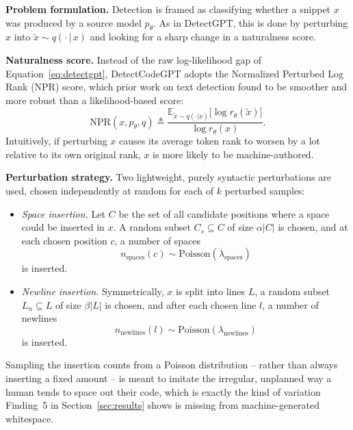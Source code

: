 \documentclass[manuscript,review]{acmart}
\begin{document}
\textbf{Problem formulation.} Detection is framed as classifying whether a snippet $x$ was produced by a source model $p_\theta$. As in DetectGPT, this is done by perturbing $x$ into $\tilde{x} \sim q(\cdot\,|\,x)$ and looking for a sharp change in a naturalness score.

\textbf{Naturalness score.} Instead of the raw log-likelihood gap of Equation~\ref{eq:detectgpt}, DetectCodeGPT adopts the Normalized Perturbed Log Rank (NPR) score, which prior work on text detection found to be smoother and more robust than a likelihood-based score:
\begin{equation}
\mathrm{NPR}(x, p_\theta, q) \triangleq \frac{\mathbb{E}_{\tilde{x}\sim q(\cdot|x)}\big[\log r_\theta(\tilde{x})\big]}{\log r_\theta(x)}.
\label{eq:npr}
\end{equation}
Intuitively, if perturbing $x$ causes its average token rank to worsen by a lot relative to its own original rank, $x$ is more likely to be machine-authored.

\textbf{Perturbation strategy.} Two lightweight, purely syntactic perturbations are used, chosen independently at random for each of $k$ perturbed samples:
\begin{itemize}
  \item \emph{Space insertion.} Let $C$ be the set of all candidate positions where a space could be inserted in $x$. A random subset $C_s \subseteq C$ of size $\alpha|C|$ is chosen, and at each chosen position $c$, a number of spaces
  \begin{equation}
    n_{\text{spaces}}(c) \sim \mathrm{Poisson}(\lambda_{\text{spaces}})
    \label{eq:spaces}
  \end{equation}
  is inserted.
  \item \emph{Newline insertion.} Symmetrically, $x$ is split into lines $L$, a random subset $L_n \subseteq L$ of size $\beta|L|$ is chosen, and after each chosen line $l$, a number of newlines
  \begin{equation}
    n_{\text{newlines}}(l) \sim \mathrm{Poisson}(\lambda_{\text{newlines}})
    \label{eq:newlines}
  \end{equation}
  is inserted.
\end{itemize}
Sampling the insertion counts from a Poisson distribution -- rather than always inserting a fixed amount -- is meant to imitate the irregular, unplanned way a human tends to space out their code, which is exactly the kind of variation Finding~5 in Section~\ref{sec:results} shows is missing from machine-generated whitespace.
\end{document}
